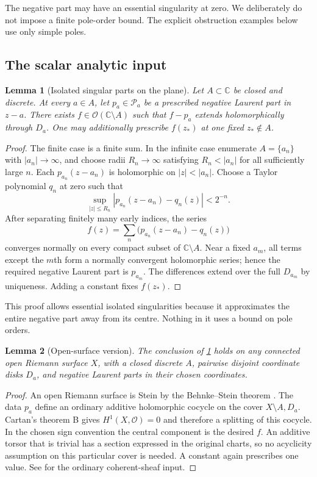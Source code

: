 \documentclass[11pt,letterpaper]{article}
\newtheorem{lemma}[lemma]{Lemma}
\theoremstyle{definition}
\theoremstyle{remark}
\newcommand{\C}{\mathbb C}
\newcommand{\OO}{\mathcal O}
\newcommand{\PP}{\mathcal P}
\numberwithin{equation}{section}
\begin{document}
The negative part may have an essential singularity at zero. We deliberately do not impose a finite pole-order bound. The explicit obstruction examples below use only simple poles.

\subsection{The scalar analytic input}

\begin{lemma}[Isolated singular parts on the plane]\label{lem:MLplane}
Let $A\subset\C$ be closed and discrete. At every $a\in A$, let $p_a\in\PP_a$ be a prescribed negative Laurent part in $z-a$. There exists $f\in\OO(\C\setminus A)$ such that $f-p_a$ extends holomorphically through $D_a$. One may additionally prescribe $f(z_*)$ at one fixed $z_*\notin A$.
\end{lemma}

\begin{proof}
The finite case is a finite sum. In the infinite case enumerate $A=\{a_n\}$ with $|a_n|\to\infty$, and choose radii $R_n\to\infty$ satisfying $R_n<|a_n|$ for all sufficiently large $n$. Each $p_{a_n}(z-a_n)$ is holomorphic on $|z|<|a_n|$. Choose a Taylor polynomial $q_n$ at zero such that
\[
 \sup_{|z|\leq R_n}|p_{a_n}(z-a_n)-q_n(z)|<2^{-n}.
\]
After separating finitely many early indices, the series
\[
 f(z)=\sum_n\bigl(p_{a_n}(z-a_n)-q_n(z)\bigr)
\]
converges normally on every compact subset of $\C\setminus A$. Near a fixed $a_m$, all terms except the $m$th form a normally convergent holomorphic series; hence the required negative Laurent part is $p_{a_m}$. The differences extend over the full $D_{a_m}$ by uniqueness. Adding a constant fixes $f(z_*)$.
\end{proof}

This proof allows essential isolated singularities because it approximates the entire negative part away from its centre. Nothing in it uses a bound on pole orders.

\begin{lemma}[Open-surface version]\label{lem:MLsurface}
The conclusion of \cref{lem:MLplane} holds on any connected open Riemann surface $X$, with a closed discrete $A$, pairwise disjoint coordinate disks $D_a$, and negative Laurent parts in their chosen coordinates.
\end{lemma}

\begin{proof}
An open Riemann surface is Stein by the Behnke--Stein theorem \cite{BS}. The data $p_a$ define an ordinary additive holomorphic cocycle on the cover $X\setminus A,D_a$. Cartan's theorem B gives $H^1(X,\OO)=0$ and therefore a splitting of this cocycle. In the chosen sign convention the central component is the desired $f$. An additive torsor that is trivial has a section expressed in the original charts, so no acyclicity assumption on this particular cover is needed. A constant again prescribes one value. See \cite{Cartan,Schmitt} for the ordinary coherent-sheaf input.
\end{proof}
\end{document}
